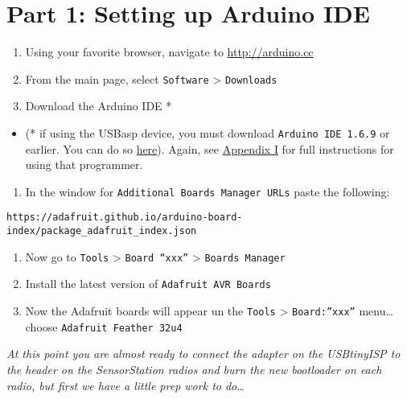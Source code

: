 \documentclass[
]{article}
\providecommand{\tightlist}{%
  \setlength{\itemsep}{0pt}\setlength{\parskip}{0pt}}
\begin{document}
\hypertarget{part-1-setting-up-arduino-ide}{%
\section{Part 1: Setting up Arduino
IDE}\label{part-1-setting-up-arduino-ide}}

\begin{enumerate}
\def\labelenumi{\arabic{enumi}.}
\tightlist
\item
  Using your favorite browser, navigate to \url{http://arduino.cc}
\item
  From the main page, select \texttt{Software} \textgreater{}
  \texttt{Downloads}
\item
  Download the Arduino IDE *
\end{enumerate}

\begin{itemize}
\tightlist
\item
  (* if using the USBasp device, you must download
  \texttt{Arduino\ IDE\ 1.6.9} or earlier. You can do so
  \href{https://www.arduino.cc/en/main/OldSoftwareReleases}{here}).
  Again, see \protect\hyperlink{Appendix_I}{Appendix I} for full
  instructions for using that programmer.
\end{itemize}

\begin{enumerate}
\def\labelenumi{\arabic{enumi}.}
\setcounter{enumi}{3}
\tightlist
\item
  In the window for \texttt{Additional\ Boards\ Manager\ URLs} paste the
  following:
\end{enumerate}

\begin{verbatim}
https://adafruit.github.io/arduino-board-index/package_adafruit_index.json
\end{verbatim}

\begin{enumerate}
\def\labelenumi{\arabic{enumi}.}
\setcounter{enumi}{4}
\item
  Now go to \texttt{Tools} \textgreater{} \texttt{Board\ “xxx”}
  \textgreater{} \texttt{Boards\ Manager}
\item
  Install the latest version of \texttt{Adafruit\ AVR\ Boards}
\item
  Now the Adafruit boards will appear un the \texttt{Tools}
  \textgreater{} \texttt{Board:”xxx”} menu\ldots choose
  \texttt{Adafruit\ Feather\ 32u4}
\end{enumerate}

\emph{At this point you are almost ready to connect the adapter on the
USBtinyISP to the header on the SensorStation radios and burn the new
bootloader on each radio, but first we have a little prep work to
do\ldots{}}
\end{document}
